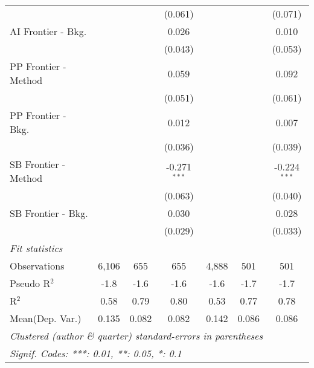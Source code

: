 \begin{tabular}{lcccccc}
                               &               &             & (0.061)        &              &             & (0.071)\\   
   AI Frontier - Bkg.          &               &             & 0.026          &              &             & 0.010\\   
                               &               &             & (0.043)        &              &             & (0.053)\\   
   PP Frontier - Method        &               &             & 0.059          &              &             & 0.092\\   
                               &               &             & (0.051)        &              &             & (0.061)\\   
   PP Frontier - Bkg.          &               &             & 0.012          &              &             & 0.007\\   
                               &               &             & (0.036)        &              &             & (0.039)\\   
   SB Frontier - Method        &               &             & -0.271$^{***}$ &              &             & -0.224$^{***}$\\   
                               &               &             & (0.063)        &              &             & (0.040)\\   
   SB Frontier - Bkg.          &               &             & 0.030          &              &             & 0.028\\   
                               &               &             & (0.029)        &              &             & (0.033)\\   
   \midrule
   \emph{Fit statistics}\\
   Observations                & 6,106         & 655         & 655            & 4,888        & 501         & 501\\  
   Pseudo R$^2$                & -1.8          & -1.6        & -1.6           & -1.6         & -1.7        & -1.7\\  
   R$^2$                       & 0.58          & 0.79        & 0.80           & 0.53         & 0.77        & 0.78\\  
Mean(Dep. Var.) & 0.135 & 0.082 & 0.082 & 0.142 & 0.086 & 0.086 \\
   \midrule \midrule
   \multicolumn{7}{l}{\emph{Clustered (author \& quarter) standard-errors in parentheses}}\\
   \multicolumn{7}{l}{\emph{Signif. Codes: ***: 0.01, **: 0.05, *: 0.1}}\\
\end{tabular}
\par\endgroup
